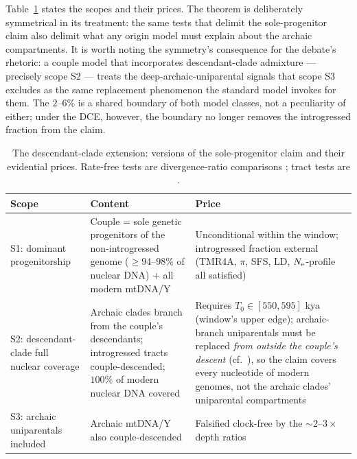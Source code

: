 Table~\ref{tab:scoping} states the scopes and their prices. The theorem is
deliberately symmetrical in its treatment: the same tests that delimit the
sole-progenitor claim also delimit what any origin model must explain about
the archaic compartments. It is worth noting the symmetry's consequence for
the debate's rhetoric: a couple model that incorporates descendant-clade
admixture --- precisely scope S2 --- treats the deep-archaic-uniparental
signals that scope S3 excludes as the same replacement phenomenon the
standard model invokes for them. The $2$--$6\%$ is a shared boundary of
both model classes, not a peculiarity of either; under the DCE, however,
the boundary no longer removes the introgressed fraction from the claim.

\begin{table}[t]
\centering\small
\caption{The descendant-clade extension: versions of the sole-progenitor
claim and their evidential prices. Rate-free tests are divergence-ratio
comparisons \citep{Green2008,Mendez2016}; tract tests are
\citep{Sankararaman2012,Sankararaman2014,Pruefer2014}.}
\label{tab:scoping}
\begin{tabular}{p{4.1cm}p{5.2cm}p{5.6cm}}
\toprule
Scope & Content & Price \\
\midrule
S1: dominant progenitorship &
Couple = sole genetic progenitors of the non-introgressed genome
($\ge 94$--$98\%$ of nuclear DNA) + all modern mtDNA/Y &
Unconditional within the window; introgressed fraction external
(TMR4A, $\pi$, SFS, LD, $N_{\mathrm{e}}$-profile all satisfied) \\
S2: descendant-clade full nuclear coverage &
Archaic clades branch from the couple's descendants; introgressed tracts
couple-descended; $100\%$ of modern nuclear DNA covered &
Requires $T_0 \in [550, 595]$ kya (window's upper edge); archaic-branch
uniparentals must be replaced \emph{from outside the couple's descent}
(cf.\ \citep{Mendez2016,Posth2017}), so the claim covers every nucleotide
of modern genomes, not the archaic clades' uniparental compartments \\
S3: archaic uniparentals included &
Archaic mtDNA/Y also couple-descended &
Falsified clock-free by the $\sim2$--$3\times$ depth ratios \\
\bottomrule
\end{tabular}
\end{table}


